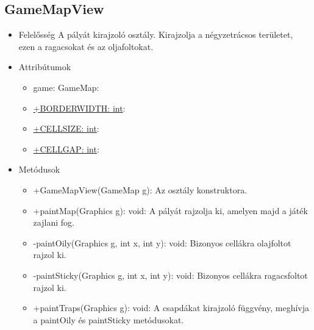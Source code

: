 \subsection{GameMapView}
\begin{itemize}
	\item Felelősség\newline
	A pályát kirajzoló osztály. Kirajzolja a négyzetrácsos területet, ezen a ragacsokat és az oljafoltokat.

	\item Attribútumok\newline
	\begin{itemize}
		\item game: GameMap: 
		\item \underline{+BORDERWIDTH: int}:
		\item \underline{+CELLSIZE: int}:
		\item \underline{+CELLGAP: int}:
	\end{itemize}
	\item Metódusok\newline
	\begin{itemize}
		\item +GameMapView(GameMap g): Az osztály konstruktora.
		\item +paintMap(Graphics g): void: A pályát rajzolja ki, amelyen majd a játék zajlani fog.
		\item -paintOily(Graphics g, int x, int y): void: Bizonyos cellákra olajfoltot rajzol ki.
		\item -paintSticky(Graphics g, int x, int y): void: Bizonyos cellákra ragacsfoltot rajzol ki.
		\item +paintTraps(Graphics g): void: A csapdákat kirajzoló függvény, meghívja a paintOily és paintSticky metódusokat.
	\end{itemize}
\end{itemize}

